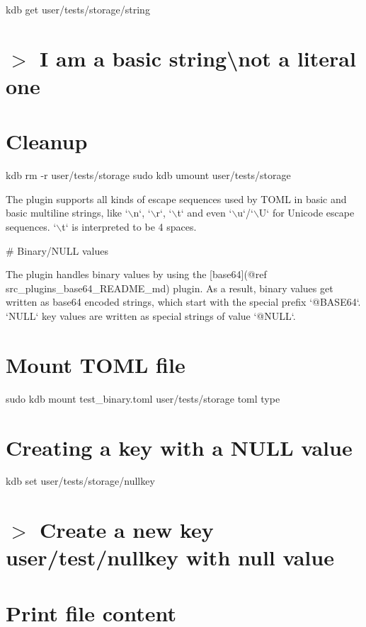 kdb get \textquotesingle{}user/tests/storage/string\textquotesingle{} \hypertarget{autotoc_md693_autotoc_md746}{}\section{$>$ I am a basic string\textbackslash{}not a literal one}\label{autotoc_md693_autotoc_md746}
\hypertarget{autotoc_md693_autotoc_md747}{}\section{Cleanup}\label{autotoc_md693_autotoc_md747}
kdb rm -\/r user/tests/storage sudo kdb umount user/tests/storage 
\begin{DoxyCode}
The plugin supports all kinds of escape sequences used by TOML in basic and basic multiline strings, like
       `\(\backslash\)n`, `\(\backslash\)r`, `\(\backslash\)t` and
even `\(\backslash\)u`/`\(\backslash\)U` for Unicode escape sequences. `\(\backslash\)t` is interpreted to be 4 spaces.

# Binary/NULL values

The plugin handles binary values by using the [base64](@ref src\_plugins\_base64\_README\_md) plugin.
As a result, binary values get written as base64 encoded strings, which start with the special prefix
       `@BASE64`.
`NULL` key values are written as special strings of value `@NULL`.
\end{DoxyCode}
 \hypertarget{autotoc_md693_autotoc_md748}{}\section{Mount T\+O\+M\+L file}\label{autotoc_md693_autotoc_md748}
sudo kdb mount test\+\_\+binary.\+toml user/tests/storage toml type\hypertarget{autotoc_md693_autotoc_md749}{}\section{Creating a key with a N\+U\+L\+L value}\label{autotoc_md693_autotoc_md749}
kdb set \textquotesingle{}user/tests/storage/nullkey\textquotesingle{} \hypertarget{autotoc_md693_autotoc_md750}{}\section{$>$ Create a new key user/test/nullkey with null value}\label{autotoc_md693_autotoc_md750}
\hypertarget{autotoc_md693_autotoc_md751}{}\section{Print file content}\label{autotoc_md693_autotoc_md751}
